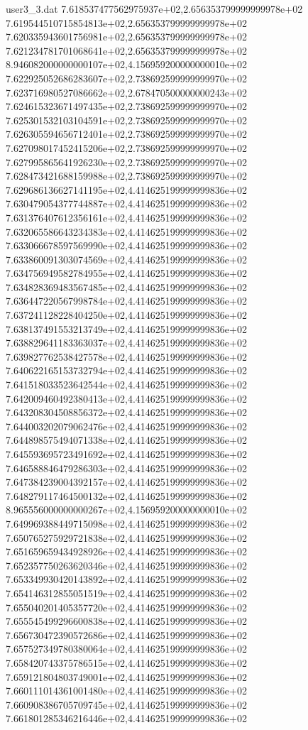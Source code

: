 \begin{filecontents}{user3_3.dat}
7.618537477562975937e+02,2.656353799999999978e+02
7.619544510715854813e+02,2.656353799999999978e+02
7.620335943601756981e+02,2.656353799999999978e+02
7.621234781701068641e+02,2.656353799999999978e+02
8.946082000000000107e+02,4.156959200000000010e+02
7.622925052686283607e+02,2.738692599999999970e+02
7.623716980527086662e+02,2.678470500000000243e+02
7.624615323671497435e+02,2.738692599999999970e+02
7.625301532103104591e+02,2.738692599999999970e+02
7.626305594656712401e+02,2.738692599999999970e+02
7.627098017452415206e+02,2.738692599999999970e+02
7.627995865641926230e+02,2.738692599999999970e+02
7.628473421688159988e+02,2.738692599999999970e+02
7.629686136627141195e+02,4.414625199999999836e+02
7.630479054377744887e+02,4.414625199999999836e+02
7.631376407612356161e+02,4.414625199999999836e+02
7.632065586643234383e+02,4.414625199999999836e+02
7.633066678597569990e+02,4.414625199999999836e+02
7.633860091303074569e+02,4.414625199999999836e+02
7.634756949582784955e+02,4.414625199999999836e+02
7.634828369483567485e+02,4.414625199999999836e+02
7.636447220567998784e+02,4.414625199999999836e+02
7.637241128228404250e+02,4.414625199999999836e+02
7.638137491553213749e+02,4.414625199999999836e+02
7.638829641183363037e+02,4.414625199999999836e+02
7.639827762538427578e+02,4.414625199999999836e+02
7.640622165153732794e+02,4.414625199999999836e+02
7.641518033523642544e+02,4.414625199999999836e+02
7.642009460492380413e+02,4.414625199999999836e+02
7.643208304508856372e+02,4.414625199999999836e+02
7.644003202079062476e+02,4.414625199999999836e+02
7.644898575494071338e+02,4.414625199999999836e+02
7.645593695723491692e+02,4.414625199999999836e+02
7.646588846479286303e+02,4.414625199999999836e+02
7.647384239004392157e+02,4.414625199999999836e+02
7.648279117464500132e+02,4.414625199999999836e+02
8.965556000000000267e+02,4.156959200000000010e+02
7.649969388449715098e+02,4.414625199999999836e+02
7.650765275929721838e+02,4.414625199999999836e+02
7.651659659434928926e+02,4.414625199999999836e+02
7.652357750263620346e+02,4.414625199999999836e+02
7.653349930420143892e+02,4.414625199999999836e+02
7.654146312855051519e+02,4.414625199999999836e+02
7.655040201405357720e+02,4.414625199999999836e+02
7.655545499296600838e+02,4.414625199999999836e+02
7.656730472390572686e+02,4.414625199999999836e+02
7.657527349780380064e+02,4.414625199999999836e+02
7.658420743375786515e+02,4.414625199999999836e+02
7.659121804803749001e+02,4.414625199999999836e+02
7.660111014361001480e+02,4.414625199999999836e+02
7.660908386705709745e+02,4.414625199999999836e+02
7.661801285346216446e+02,4.414625199999999836e+02

\end{filecontents}

